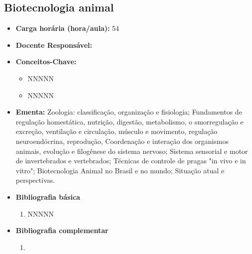\documentclass[11pt,fleqn]{book} %
\begin{document}
\subsection{Biotecnologia animal}\label{disc:biotecAnimal}
\begin{itemize}
	\item \textbf{Carga horária (hora/aula):} 54
	\item \textbf{Docente Responsável:}
	\item \textbf{Conceitos-Chave:}
	\begin{itemize}
		\item NNNNN
		\item NNNNN
	\end{itemize}
	\item \textbf{Ementa:} Zoologia: classificação, organização e fisiologia;
	Fundamentos de regulação homestática, nutrição, digestão, metabolismo, o smorregulação e excreção, ventilação e circulação, músculo e movimento, regulação neuroendócrina, reprodução, Coordenação e interação dos organismos animais, evolução e filogênese do sistema nervoso; 
	Sistema sensorial e motor de invertebrados e vertebrados; 
	Técnicas de controle de pragas "in vivo e in vitro";
	Biotecnologia Animal no Brasil e no mundo; 
	Situação atual e perspectivas.
	\item \textbf{Bibliografia básica}
	\begin{enumerate}
		\item NNNNN
	\end{enumerate}
	\item \textbf{Bibliografia complementar}
	\begin{enumerate}
		\item 
	\end{enumerate}	
\end{itemize}


\newpage
\end{document}
